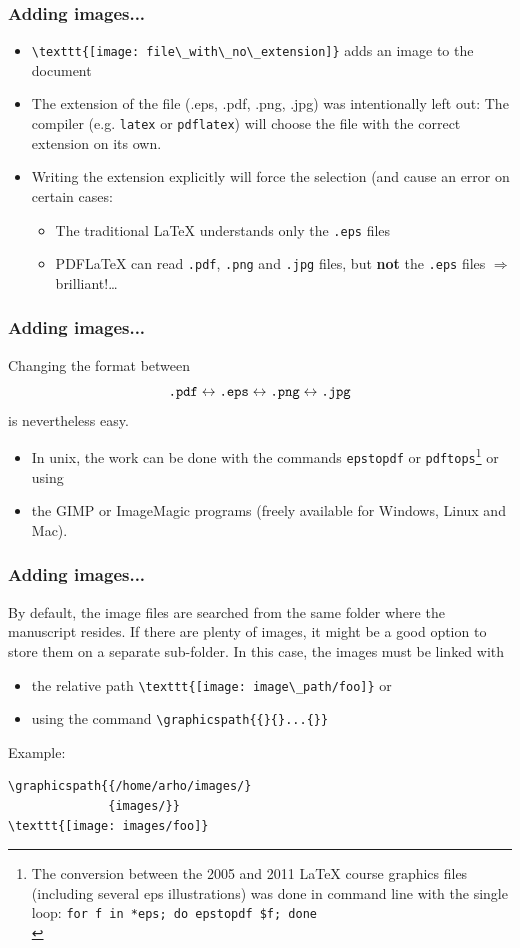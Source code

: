 \documentclass[13pt]{beamer}
\begin{document}
\begin{frame}[fragile]\frametitle{Adding images...}
\begin{itemize}
\item \verb|\texttt{[image: file\_with\_no\_extension]}|
adds an image to the document
\item The extension of the file (.eps, .pdf, .png, .jpg) was intentionally left
out: The compiler (e.g. \texttt{latex} or \texttt{pdflatex}) will choose the
file with the correct extension on its own. 
\item Writing the extension explicitly will force the selection
(and cause an error on certain cases:
\begin{itemize}
\item The traditional \LaTeX{} understands only the \texttt{.eps} files
\item PDF\LaTeX{} can read \texttt{.pdf}, \texttt{.png} and \texttt{.jpg} 
  files, but \textbf{not} the \texttt{.eps} files $\Rightarrow$ 
  brilliant!\dots
\end{itemize}
\end{itemize}
\end{frame}


\begin{frame}[fragile]\frametitle{Adding images...}
Changing the format between 
\[ \text{\texttt{.pdf}} \leftrightarrow
   \text{\texttt{.eps}} \leftrightarrow
   \text{\texttt{.png}} \leftrightarrow
   \text{\texttt{.jpg}} \]
is nevertheless easy.
\begin{itemize}  
\item In unix, the work can be done with the commands
\texttt{epstopdf} or \texttt{pdftops}\footnote{The conversion between the 2005
and 2011 LaTeX course graphics files (including several eps illustrations) was
done in command line with the single loop: \texttt{for f in *eps; do epstopdf \$f;
done}\\ \strut} or using
\item the GIMP or ImageMagic programs (freely available for Windows, Linux and
Mac).
\end{itemize}
\end{frame}


\begin{frame}[fragile]\frametitle{Adding images...}
By default, the image files are searched from the same folder where the
manuscript resides. If there are plenty of images, it might be a good option
to store them on a separate sub-folder. In this case, the images must be linked
with 
\begin{itemize}
\item the relative path \verb|\texttt{[image: image\_path/foo]}| or
\item using the command \verb|\graphicspath{{}{}...{}}|
\end{itemize}
Example:
\begin{verbatim}
\graphicspath{{/home/arho/images/}
              {images/}}
\texttt{[image: images/foo]}
\end{verbatim}
\end{frame}
\end{document}
